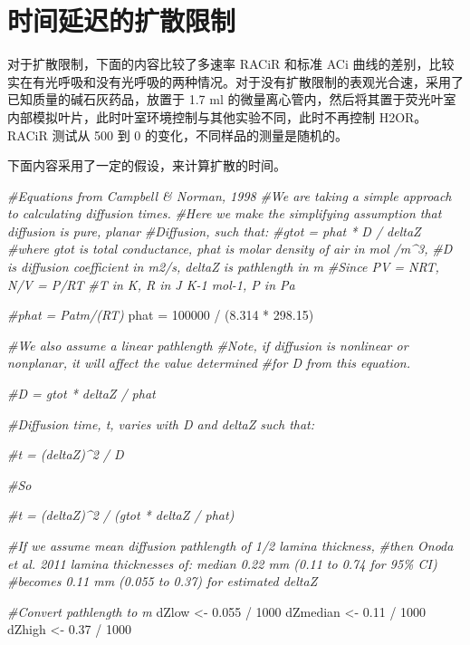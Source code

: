 \documentclass[
]{krantz}
\makeatletter
\newenvironment{Shaded}{\begin{snugshade}}{\end{snugshade}}
\newcommand{\CommentTok}[1]{\textcolor[rgb]{0.56,0.35,0.01}{\textit{#1}}}
\newcommand{\DecValTok}[1]{\textcolor[rgb]{0.00,0.00,0.81}{#1}}
\newcommand{\FloatTok}[1]{\textcolor[rgb]{0.00,0.00,0.81}{#1}}
\newcommand{\NormalTok}[1]{#1}
\newcommand{\OtherTok}[1]{\textcolor[rgb]{0.56,0.35,0.01}{#1}}
\newcommand{\SpecialCharTok}[1]{\textcolor[rgb]{0.00,0.00,0.00}{#1}}
\newenvironment{kframe}{%
\medskip{}
\setlength{\fboxsep}{.8em}
 \def\at@end@of@kframe{}%
 \ifinner\ifhmode%
  \def\at@end@of@kframe{\end{minipage}}%
  \begin{minipage}{\columnwidth}%
 \fi\fi%
 \def\FrameCommand##1{\hskip\@totalleftmargin \hskip-\fboxsep
 \colorbox{shadecolor}{##1}\hskip-\fboxsep
     \hskip-\linewidth \hskip-\@totalleftmargin \hskip\columnwidth}%
 \MakeFramed {\advance\hsize-\width
   \@totalleftmargin\z@ \linewidth\hsize
   \@setminipage}}%
 {\par\unskip\endMakeFramed%
 \at@end@of@kframe}
\renewenvironment{Shaded}{\begin{kframe}}{\end{kframe}}
\makeatother
\begin{document}
\hypertarget{multi11}{%
\section{时间延迟的扩散限制}\label{multi11}}

对于扩散限制，下面的内容比较了多速率 RACiR 和标准 ACi 曲线的差别，比较实在有光呼吸和没有光呼吸的两种情况。对于没有扩散限制的表观光合速，采用了已知质量的碱石灰药品，放置于 1.7 ml 的微量离心管内，然后将其置于荧光叶室内部模拟叶片，此时叶室环境控制与其他实验不同，此时不再控制 H2OR。RACiR 测试从 500 到 0 的变化，不同样品的测量是随机的。

下面内容采用了一定的假设，来计算扩散的时间。

\begin{Shaded}
\begin{Highlighting}[]
\CommentTok{\#Equations from Campbell \& Norman, 1998}
\CommentTok{\#We are taking a simple approach to calculating diffusion times.}
\CommentTok{\#Here we make the simplifying assumption that diffusion is pure, planar}
\CommentTok{\#Diffusion, such that:}
\CommentTok{\#gtot = phat * D / deltaZ}
\CommentTok{\#where gtot is total conductance, phat is molar density of air in mol /m\^{}3,}
\CommentTok{\#D is diffusion coefficient in m2/s, deltaZ is pathlength in m}
\CommentTok{\#Since PV = NRT, N/V = P/RT}
\CommentTok{\#T in K, R in J K{-}1 mol{-}1, P in Pa}

\CommentTok{\#phat = Patm/(RT)}
\NormalTok{phat }\OtherTok{=} \DecValTok{100000} \SpecialCharTok{/}\NormalTok{ (}\FloatTok{8.314} \SpecialCharTok{*} \FloatTok{298.15}\NormalTok{)}

\CommentTok{\#We also assume a linear pathlength}
\CommentTok{\#Note, if diffusion is nonlinear or nonplanar, it will affect the value determined}
\CommentTok{\#for D from this equation.}

\CommentTok{\#D = gtot * deltaZ / phat}

\CommentTok{\#Diffusion time, t, varies with D and deltaZ such that:}

\CommentTok{\#t = (deltaZ)\^{}2 / D}

\CommentTok{\#So}

\CommentTok{\#t = (deltaZ)\^{}2 / (gtot * deltaZ / phat)}

\CommentTok{\#If we assume mean diffusion pathlength of 1/2 lamina thickness,}
\CommentTok{\#then Onoda et al. 2011 lamina thicknesses of: median 0.22 mm (0.11 to 0.74 for 95\% CI)}
\CommentTok{\#becomes 0.11 mm (0.055 to 0.37) for estimated deltaZ}

\CommentTok{\#Convert pathlength to m}
\NormalTok{dZlow }\OtherTok{\textless{}{-}} \FloatTok{0.055} \SpecialCharTok{/} \DecValTok{1000}
\NormalTok{dZmedian }\OtherTok{\textless{}{-}} \FloatTok{0.11} \SpecialCharTok{/} \DecValTok{1000}
\NormalTok{dZhigh }\OtherTok{\textless{}{-}} \FloatTok{0.37} \SpecialCharTok{/} \DecValTok{1000}
\end{Highlighting}
\end{Shaded}
\end{document}
